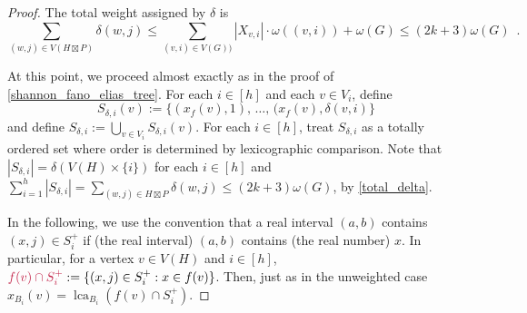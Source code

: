\documentclass[twoside,leqno]{article}
\makeatletter
\renewcommand{\le}{\leqslant}
\def\mathcolor#1#{\@mathcolor{#1}}
\def\@mathcolor#1#2#3{%
  \protect\leavevmode
  \begingroup
    \color#1{#2}#3%
  \endgroup
}
\newcommand{\mathdefin}[1]{\mathcolor{brightmaroon}{#1}}
\DeclareMathOperator{\lca}{lca}
\makeatother
\begin{document}
\begin{proof}
    The total weight assigned by $\delta$ is
    \begin{equation}
      \sum_{(w,j)\in V(H\boxtimes P)} \delta(w,j)
      \le \sum_{(v,i)\in V(G))}|X_{v,i}|\cdot\omega((v,i)) + \omega(G)
      \le (2k+3)\omega(G) \enspace .
      \label{total_delta}
    \end{equation}

    At this point, we proceed almost exactly as in the proof of \cref{shannon_fano_elias_tree}.
    For each $i\in[h]$ and each $v\in V_i$, define
    \[
      S_{\delta,i}(v):=\{(x_f(v),1),\,\ldots,\, (x_f(v),\delta(v,i)\}
    \]
    and define $S_{\delta,i}:=\bigcup_{v\in V_i}S_{\delta,i}(v)$.  For each $i\in[h]$, treat $S_{\delta,i}$ as a totally ordered set where order is determined by lexicographic comparison.  Note that $|S_{\delta,i}|=\delta(V(H)\times\{i\})$ for each $i\in[h]$ and $\sum_{i=1}^h |S_{\delta,i}|=\sum_{(w,j)\in H\boxtimes P}\delta(w,j)\le (2k+3)\omega(G)$, by \cref{total_delta}.

    In the following, we use the convention that a real interval $(a,b)$ contains $(x,j)\in S^+_i$ if (the real interval) $(a,b)$ contains (the real number) $x$. In particular, for a vertex $v\in V(H)$ and $i\in[h]$, $\mathdefin{f(v)\cap S^+_i}:=\{(x,j)\in S^+_i:x\in f(v)\}$. Then, just as in the unweighted case $x_{B_i}(v)=\lca_{B_i}(f(v)\cap S^+_i)$.


\end{proof}
\end{document}
